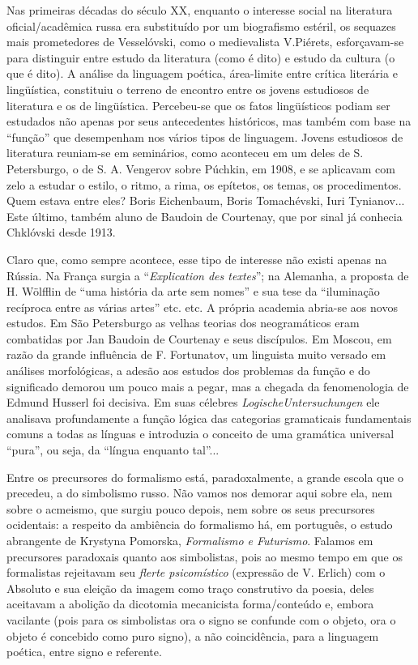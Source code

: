 Nas primeiras décadas do século XX, enquanto o interesse social na
literatura oficial/acadêmica russa era substituído por um biografismo
estéril, os sequazes mais prometedores de Vesselóvski, como o
medievalista V.Piérets, esforçavam-se para distinguir entre estudo da
literatura (como é dito) e estudo da cultura (o que é dito). A análise
da linguagem poética, área-limite entre crítica literária e lingüística,
constituiu o terreno de encontro entre os jovens estudiosos de
literatura e os de lingüística. Percebeu-se que os fatos lingüísticos
podiam ser estudados não apenas por seus antecedentes históricos, mas
também com base na ``função'' que desempenham nos vários tipos de
linguagem. Jovens estudiosos de literatura reuniam-se em seminários,
como aconteceu em um deles de S. Petersburgo, o de S. A. Vengerov sobre
Púchkin, em 1908, e se aplicavam com zelo a estudar o estilo, o ritmo, a
rima, os epítetos, os temas, os procedimentos. Quem estava entre eles?
Boris Eichenbaum, Boris Tomachévski, Iuri Tynianov... Este último,
também aluno de Baudoin de Courtenay, que por sinal já conhecia
Chklóvski desde 1913.

Claro que, como sempre acontece, esse tipo de interesse não existi
apenas na Rússia. Na França surgia a ``\emph{Explication des textes}'';
na Alemanha, a proposta de H. Wölfflin de ``uma história da arte sem
nomes'' e sua tese da ``iluminação recíproca entre as várias artes''
etc. etc. A própria academia abria-se aos novos estudos. Em São
Petersburgo as velhas teorias dos neogramáticos eram combatidas por Jan
Baudoin de Courtenay e seus discípulos. Em Moscou, em razão da grande
influência de F. Fortunatov, um linguista muito versado em análises
morfológicas, a adesão aos estudos dos problemas da função e do
significado demorou um pouco mais a pegar, mas a chegada da
fenomenologia de Edmund Husserl foi decisiva. Em suas célebres
\emph{LogischeUntersuchungen} ele analisava profundamente a função
lógica das categorias gramaticais fundamentais comuns a todas as línguas
e introduzia o conceito de uma gramática universal ``pura'', ou seja, da
``língua enquanto tal''...

Entre os precursores do formalismo está, paradoxalmente, a grande escola
que o precedeu, a do simbolismo russo. Não vamos nos demorar aqui sobre
ela, nem sobre o acmeismo, que surgiu pouco depois, nem sobre os seus
precursores ocidentais: a respeito da ambiência do formalismo há, em
português, o estudo abrangente de Krystyna Pomorska, \emph{Formalismo e
Futurismo}. Falamos em precursores paradoxais quanto aos simbolistas,
pois ao mesmo tempo em que os formalistas rejeitavam seu \emph{flerte
psicomístico} (expressão de V. Erlich) com o Absoluto e sua eleição da
imagem como traço construtivo da poesia, deles aceitavam a abolição da
dicotomia mecanicista forma/conteúdo e, embora vacilante (pois para os
simbolistas ora o signo se confunde com o objeto, ora o objeto é
concebido como puro signo), a não coincidência, para a linguagem
poética, entre signo e referente.

